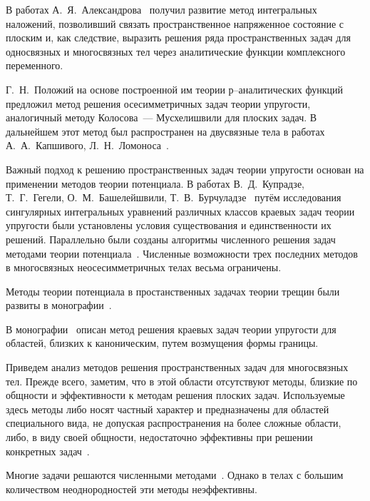 В работах А.~Я.~Александрова~\cite{Aleksandrov1978, Aleksandrov1973} получил развитие метод интегральных наложений, позволивший связать пространственное напряженное состояние с плоским и, как следствие, выразить решения ряда пространственных задач для односвязных и многосвязных тел через аналитические функции комплексного переменного.

Г.~Н.~Положий на основе построенной им теории р–аналитических функций предложил метод решения осесимметричных задач теории упругости, аналогичный методу Колосова~--- Мусхелишвили для плоских задач. В дальнейшем этот метод был распространен на двусвязные тела в работах А.~А.~Капшивого, Л.~Н.~Ломоноса~\cite{Kapshiviy, Lomonos}.

Важный подход к решению пространственных задач теории упругости основан на применении методов теории потенциала. В работах В.~Д.~Купрадзе, Т.~Г.~Гегели, О.~М.~Башелейшвили, Т.~В.~Бурчуладзе~\cite{Kupradze, Burchuladze} путём исследования сингулярных интегральных уравнений различных классов краевых задач теории упругости были установлены условия существования и единственности их решений. Параллельно были созданы алгоритмы численного решения задач методами теории потенциала~\cite{Aleksandrov1973}. Численные возможности трех последних методов в многосвязных неосесимметричных телах весьма ограничены.
 
Методы теории потенциала в простанственных задачах теории трещин были развиты в монографии~\cite{Kit}.
  
В монографии~\cite{Guz1984} описан метод решения краевых задач теории упругости для областей, близких к каноническим, путем возмущения формы границы.

Приведем анализ методов решения пространственных задач для многосвязных тел. Прежде всего, заметим, что в этой области отсутствуют методы, близкие по общности и эффективности к методам решения плоских задач. Используемые здесь методы либо носят частный характер и предназначены для областей специального вида, не допуская распространения на более сложные области, либо, в виду своей общности, недостаточно эффективны при решении конкретных задач~\cite{Chen1978-2, Miyamoto, Sheikh, Strenberg}.

Многие задачи решаются численными методами~\cite{Method, Erzhanov}. Однако в телах с большим количеством неоднородностей эти методы неэффективны.

